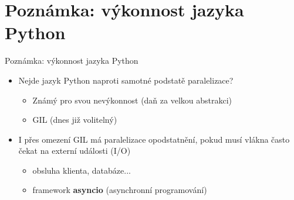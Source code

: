 \documentclass{beamer}
\begin{document}
\section{Poznámka: výkonnost jazyka Python}
\begin{frame}{Poznámka: výkonnost jazyka Python}
	\begin{itemize}
    \item Nejde jazyk Python naproti samotné podstatě paralelizace?
    \begin{itemize}
      \item [\textendash] Známý pro svou nevýkonnost (daň za velkou abstrakci)      
      \item [\textendash] GIL (dnes již volitelný)
    \end{itemize}

    \item I přes omezení GIL má paralelizace opodstatnění, pokud musí vlákna často čekat na externí události (I/O)
    \begin{itemize}
      \item obsluha klienta, databáze...
      \item framework \textbf{asyncio} (asynchronní programování)
    \end{itemize}
  \end{itemize}
\end{frame}
\end{document}

